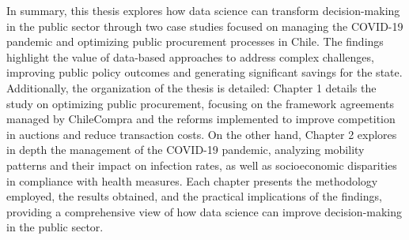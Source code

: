 \begin{intro}
    In summary, this thesis explores how data science can transform decision-making in the public sector through two case studies focused on managing the COVID-19 pandemic and optimizing public procurement processes in Chile. The findings highlight the value of data-based approaches to address complex challenges, improving public policy outcomes and generating significant savings for the state. Additionally, the organization of the thesis is detailed: Chapter 1 details the study on optimizing public procurement, focusing on the framework agreements managed by ChileCompra and the reforms implemented to improve competition in auctions and reduce transaction costs. On the other hand, Chapter 2 explores in depth the management of the COVID-19 pandemic, analyzing mobility patterns and their impact on infection rates, as well as socioeconomic disparities in compliance with health measures. Each chapter presents the methodology employed, the results obtained, and the practical implications of the findings, providing a comprehensive view of how data science can improve decision-making in the public sector.
    
    
    
\end{intro}
